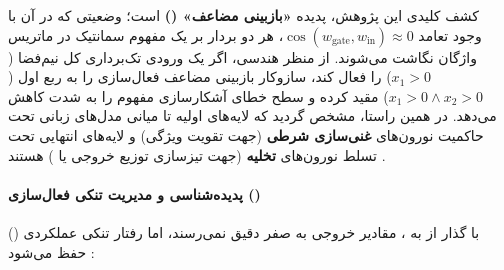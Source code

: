 کشف کلیدی این پژوهش، پدیده \textbf{«بازبینی مضاعف» ()} است؛ وضعیتی که در آن با وجود تعامد $\cos(w_{\text{gate}}, w_{\text{in}}) \approx 0$، هر دو بردار بر یک مفهوم سمانتیک در ماتریس واژگان نگاشت می‌شوند. از منظر هندسی، اگر یک ورودی تک‌برداری کل نیم‌فضا ($x_1 > 0$) را فعال کند، سازوکار بازبینی مضاعف فعال‌سازی را به ربع اول ($x_1 > 0 \land x_2 > 0$) مقید کرده و سطح خطای آشکارسازی مفهوم را به شدت کاهش می‌دهد. در همین راستا، مشخص گردید که لایه‌های اولیه تا میانی مدل‌های زبانی تحت حاکمیت نورون‌های \textbf{غنی‌سازی شرطی} (جهت تقویت ویژگی) و لایه‌های انتهایی تحت تسلط نورون‌های \textbf{تخلیه} (جهت تیزسازی توزیع خروجی یا ) هستند \cite{gerstner2025understanding, lad2024stages}.

\paragraph*{پدیده‌شناسی و مدیریت تنکی فعال‌سازی ()}
با گذار از  به ، مقادیر خروجی به صفر دقیق نمی‌رسند، اما رفتار تنکی عملکردی () حفظ می‌شود \cite{szatkowski2026universal}:
